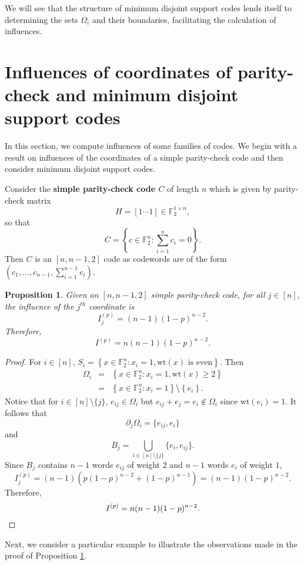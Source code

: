 \documentclass[12pt]{article}
\newcommand{\F}{\mathbb{F}}
\newcommand{\wt}{\mathrm{wt}}
\def\F{\mathbb F}
\newtheorem{proposition}[theorem]{Proposition}
\theoremstyle{definition}
\begin{document}
We will see that the structure of minimum disjoint support codes lends itself to determining the sets $\Omega_i$ and their boundaries, facilitating the calculation of influences. 


\section{Influences of coordinates of parity-check and minimum disjoint support codes} \label{inf_section}

In this section, we compute influences of some families of codes. We begin with a result on influences of the coordinates of a simple parity-check code and then consider minimum disjoint support codes.

Consider the {\bf simple parity-check code $C$} of length $n$ which is given by parity-check matrix $$H = [1 \cdots 1] \in \F_2^{1 \times n},$$ so that
$$
C = \left\{ c \in \F_2^n\colon \sum_{i=1}^n c_i = 0 \right\}.$$
Then $C$ is an $[n, n-1,2]$ code as codewords are of the form $(c_1, \dots, c_{n-1}, \sum_{i=1}^{n-1} c_i)$. 

\begin{proposition} \label{pc_inf_prop}
Given an $[n, n-1,2]$ simple parity-check code, for all $j \in [n]$, the influence of the $j^{th}$ coordinate is 
$$I_j^{(p)} = (n-1)(1-p)^{n-2}.$$
Therefore, 
$$I^{(p)}=n(n-1)(1-p)^{n-2}.$$
\end{proposition}


\begin{proof}
For $i \in [n]$, $S_i = \left\{ x \in \F_2^n\colon x_i = 1, \wt(x) \mbox{ is even} \right\}$. Then 
$$
\begin{array}{lll}
\Omega_i &=& \left\{ x \in \F_2^n\colon x_i = 1, \wt(x) \geq 2 \right\} \\
& = & \left\{ x \in \F_2^n\colon x_i = 1 \right\} \setminus \left\{ e_i \right \}.
\end{array}
$$ 
Notice that for $i \in [n] \setminus \{ j \}$, $e_{ij} \in \Omega_i$ but $e_{ij}+e_j = e_i \notin \Omega_i$ since $\wt(e_i)=1$. It follows that 
 $$\partial_j \Omega_i = \{ e_{ij}, e_i \}$$ and 
$$B_j = \bigcup_{i \in [n] \setminus \{ j \} }  \{  e_i, e_{ij} \}.$$
Since $B_j$ contains $n-1$ words $e_{ij}$ of weight $2$ and $n-1$ words $e_i$ of weight $1$, 
$$I_j^{(p)} = (n-1) \left( p(1-p)^{n - 2} + (1-p)^{n-1} \right) = (n-1)(1-p)^{n-2}.$$
Therefore, 
\[I^{(p)}=n(n-1)(1-p)^{n-2}. \qedhere\]
\end{proof}

Next, we consider a particular example to illustrate the observations made in the proof of Proposition \ref{pc_inf_prop}. 
\end{document}
